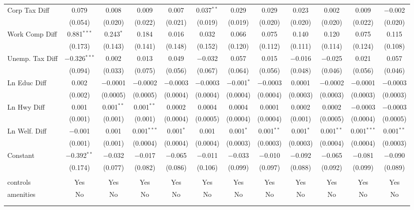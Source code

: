 \begin{table}[!htbp]
\begin{tabular}{@{\extracolsep{5pt}}lccccccccccc}
  Corp Tax Diff & 0.079 & 0.008 & 0.009 & 0.007 & 0.037$^{**}$ & 0.029 & 0.029 & 0.023 & 0.002 & 0.009 & $-$0.002 \\ 
  & (0.054) & (0.020) & (0.022) & (0.021) & (0.019) & (0.019) & (0.020) & (0.020) & (0.020) & (0.022) & (0.020) \\ 
  Work Comp Diff & 0.881$^{***}$ & 0.243$^{*}$ & 0.184 & 0.016 & 0.032 & 0.066 & 0.075 & 0.140 & 0.120 & 0.075 & 0.115 \\ 
  & (0.173) & (0.143) & (0.141) & (0.148) & (0.152) & (0.120) & (0.112) & (0.111) & (0.114) & (0.124) & (0.108) \\ 
  Unemp. Tax Diff & $-$0.326$^{***}$ & 0.002 & 0.013 & 0.049 & $-$0.032 & 0.057 & 0.015 & $-$0.016 & $-$0.025 & 0.021 & 0.057 \\ 
  & (0.094) & (0.033) & (0.075) & (0.056) & (0.067) & (0.064) & (0.056) & (0.048) & (0.046) & (0.056) & (0.046) \\ 
  Ln Educ Diff & 0.002 & $-$0.0001 & $-$0.0002 & $-$0.0003 & $-$0.0003 & $-$0.001$^{*}$ & $-$0.0003 & 0.0001 & $-$0.0002 & $-$0.0001 & $-$0.0003 \\ 
  & (0.002) & (0.0005) & (0.0005) & (0.0004) & (0.0004) & (0.0004) & (0.0004) & (0.0003) & (0.0003) & (0.0003) & (0.0003) \\ 
  Ln Hwy Diff & 0.001 & 0.001$^{**}$ & 0.001$^{**}$ & 0.0002 & 0.0004 & 0.0004 & 0.0001 & 0.0002 & 0.0002 & $-$0.0003 & $-$0.0003 \\ 
  & (0.001) & (0.001) & (0.001) & (0.0004) & (0.0005) & (0.0004) & (0.0004) & (0.001) & (0.0005) & (0.0004) & (0.0005) \\ 
  Ln Welf. Diff & $-$0.001 & 0.001 & 0.001$^{***}$ & 0.001$^{*}$ & 0.001 & 0.001$^{*}$ & 0.001$^{**}$ & 0.001$^{*}$ & 0.001$^{**}$ & 0.001$^{***}$ & 0.001$^{**}$ \\ 
  & (0.001) & (0.001) & (0.0004) & (0.0004) & (0.0004) & (0.0003) & (0.0003) & (0.0003) & (0.0004) & (0.0004) & (0.0003) \\ 
  Constant & $-$0.392$^{**}$ & $-$0.032 & $-$0.017 & $-$0.065 & $-$0.011 & $-$0.033 & $-$0.010 & $-$0.092 & $-$0.065 & $-$0.081 & $-$0.090 \\ 
  & (0.174) & (0.077) & (0.082) & (0.086) & (0.106) & (0.099) & (0.097) & (0.088) & (0.092) & (0.099) & (0.089) \\ 
 \hline \\[-1.8ex] 
controls & Yes & Yes & Yes & Yes & Yes & Yes & Yes & Yes & Yes & Yes & Yes \\ 
amenities & No & No & No & No & No & No & No & No & No & No & No \\ 
\hline \\[-1.8ex] 
\hline 
\hline \\[-1.8ex] 
\end{tabular} 
\end{table} 
